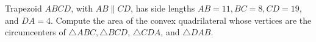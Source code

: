 Trapezoid $A B C D$, with $A B \| C D$, has side lengths $A B=11, B C=8, C D=19$, and $D A=4$. Compute the area of the convex quadrilateral whose vertices are the circumcenters of $\triangle A B C, \triangle B C D$, $\triangle C D A$, and $\triangle D A B$.